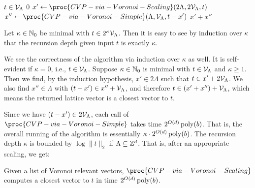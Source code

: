 \begin{codebox}
  \li \If $t \in \mathcal{V}_\Lambda$
  \li \Then \Return $0$
      \End
  \li $x' \gets \proc{CVP-via-Voronoi-Scaling}(2\Lambda, 2\cV_\Lambda, t)$
  \li $x'' \gets \proc{CVP-via-Voronoi-Simple}(\Lambda, \cV_\Lambda, t - x')$
  \li \Return $x' + x''$
\end{codebox}
Let $\kappa \in \mathbb{N}_0$ be minimal with $t \in 2^\kappa \mathcal{V}_\Lambda$.
Then it is easy to see by induction over $\kappa$
that the recursion depth given input $t$ is exactly $\kappa$.

We see the correctness of the algorithm via induction over $\kappa$ as well.
It is self-evident if $\kappa = 0$, i.e., $t \in \mathcal{V}_\Lambda$.
Suppose $\kappa \in \mathbb{N}_0$ is minimal with $t \in \mathcal{V}_\Lambda$ and $\kappa \geq 1$.
Then we find, by the induction hypothesis,
$x' \in 2\Lambda$ such that $t \in x' + 2\mathcal{V}_\Lambda$.
We also find $x'' \in \Lambda$ with $(t-x') \in x'' + \mathcal{V}_\Lambda$,
and therefore $t \in (x' + x'') + \mathcal{V}_\Lambda$,
which means the returned lattice vector is a closest vector to $t$.

Since we have $(t - x') \in 2\mathcal{V}_\Lambda$,
each call of $\proc{CVP-via-Voronoi-Simple}$
takes time $2^{O(d)} \operatorname{poly}(b)$.
That is, the overall running of the algorithm is essentially $\kappa \cdot 2^{O(d)} \operatorname{poly}(b)$.
The recursion depth $\kappa$ is bounded by $\log \|t\|_2$ if $\Lambda \subseteq \mathbb{Z}^d$.
That is, after an appropriate scaling, we get:

\begin{theorem}
  Given a list of Voronoi relevant vectors,
  $\proc{CVP-via-Voronoi-Scaling}$ computes a closest vector to $t$ in time $2^{O(d)} \operatorname{poly}(b)$.
\end{theorem}


